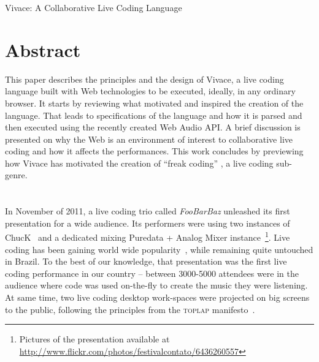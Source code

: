 \documentclass[letterpaper, 12pt]{article}
\begin{document}

\vspace*{24pt}


 {\cmjTitle Vivace: A Collaborative Live Coding Language}


\section*{Abstract}

This paper describes the principles and the design of Vivace, a live
coding language built with Web technologies to be executed, ideally, in
any ordinary browser. It starts by reviewing what motivated and
inspired the creation of the language. That leads to specifications of
the language and how it is parsed and then executed using the recently
created Web Audio API. A brief discussion is presented on why the Web
is an environment of interest to collaborative live coding and how it
affects the performances. This work concludes by previewing how
Vivace has motivated the creation of ``freak coding'' , a live coding
sub-genre.

\section*{} %

In November of 2011, a live coding trio called \textit{FooBarBaz}
unleashed its first presentation for a wide audience. Its performers
were using two instances of ChucK~\citep*{wang2003chuck} and a
dedicated mixing Puredata + Analog Mixer instance~\footnote{Pictures
  of the presentation available at
  \url{http://www.flickr.com/photos/festivalcontato/6436260557}}. Live
coding has been gaining world wide popularity~\citep*{nilson2007live}, while
remaining quite untouched in Brazil. To the best of our knowledge, that
presentation was the first live coding performance in our
country -- between 3000-5000 attendees were in the
audience where code was used on-the-fly to create the music they were
listening. At same time, two live coding desktop work-spaces were projected
on big screens to the public, following the principles from the
\textsc{toplap} manifesto~\citep*{ward2004live}.
\end{document}
